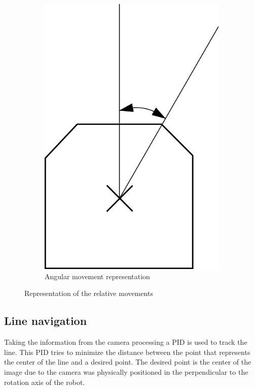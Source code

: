 \begin{figure}
        \hspace{40pt}
        \begin{subfigure}[b]{0.296\textwidth}
            \includegraphics[width=\textwidth]{figs/mr_relative_angular}
            \caption{Angular movement representation}
            \label{fig:mr_relative_angular}
    \end{subfigure}
    \caption{Representation of the relative movements}
    \end{figure}


    \subsection{Line navigation} %
    \label{sub:mr_line_navigation}
    Taking the information from the camera processing a PID is used to track the line.
    This PID tries to minimize the distance between the point that represents the center of the line and a desired point.
    The desired point is the center of the image due to the camera was physically positioned in the perpendicular to the rotation axis of the robot.


